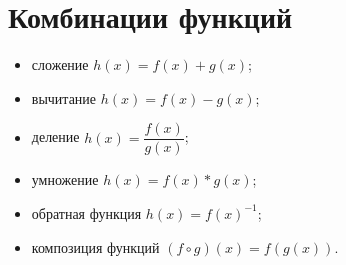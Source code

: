 \documentclass[a4paper,14pt]{report}
\begin{document}
\section*{ \colorbox{light-blue}{Комбинации функций}}
\begin{itemize}
	\item сложение $h(x) = f(x) + g(x)$;
	\item вычитание $h(x) = f(x)- g(x)$;
	\item деление $h(x) = \dfrac{f(x)}{g(x)}$;
	\item умножение $h(x) = f(x) * g(x)$;
	\item обратная функция $h(x) = f(x)^{-1}$;
	\item композиция функций $(f \circ g)(x) = f(g(x))$.
\end{itemize}
\end{document}
